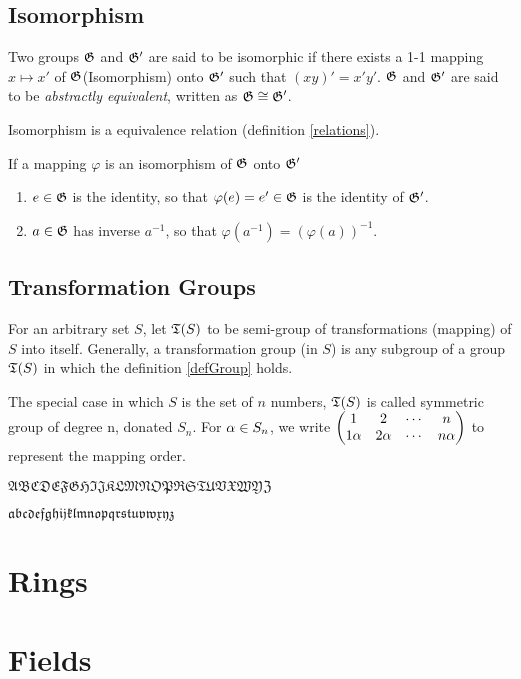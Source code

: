 	\subsection{Isomorphism}
		\begin{definition}
		Two groups $\mathfrak{G}$ and $\mathfrak{G}'$ are said to be isomorphic if there exists a 1-1 mapping $x\mapsto x'$ of $\mathfrak{G}$(Isomorphism) onto $\mathfrak{G}'$ such that $(xy)'=x'y'$. $\mathfrak{G}$ and $\mathfrak{G}'$ are said to be \textit{abstractly equivalent}, written as $\mathfrak{G}\cong\mathfrak{G}'$.
		\end{definition}
		\begin{theorem}
		Isomorphism is a equivalence relation (definition \ref{relations}). 
		\end{theorem}
		\begin{theorem}
		If a mapping $\varphi$ is an isomorphism of $\mathfrak{G}$ onto $\mathfrak{G}'$
 		\begin{enumerate}
		\item $e\in\mathfrak{G}$ is the identity, so that $\varphi(e)=e'\in\mathfrak{G}$ is the identity of $\mathfrak{G}'$.
		\item $a\in\mathfrak{G}$ has inverse $a^{-1}$, so that $\varphi(a^{-1})=(\varphi(a))^{-1}$.
		\end{enumerate}
		\end{theorem}
	\subsection{Transformation Groups}
	\begin{definition}
	For an arbitrary set $S$, let $\mathfrak{T}(S)$ to be semi-group of transformations (mapping) of $S$ into itself. Generally, a transformation group (in $S$) is any subgroup of a group $\mathfrak{T}(S)$ in which the definition \ref{defGroup} holds.
	\end{definition}
	\begin{definition}
	The special case in which $S$ is the set of $n$ numbers, $\mathfrak{T}(S)$ is called symmetric group of degree n, donated $S_n$. For $\alpha\in S_n$, we write 
	$\begin{pmatrix}
	1 & 2 & \cdots & n\\
	1\alpha & 2\alpha & \cdots & n\alpha\\
	\end{pmatrix}$
	to represent the mapping order.
	\end{definition}
	
	$\mathfrak{ABCDEFGHIJKLMNOPRSTUVXWYZ}$
	
	$\mathfrak{abcdefghijklmnopqrstuvwxyz}$
	\section{Rings}
	\section{Fields}
	

